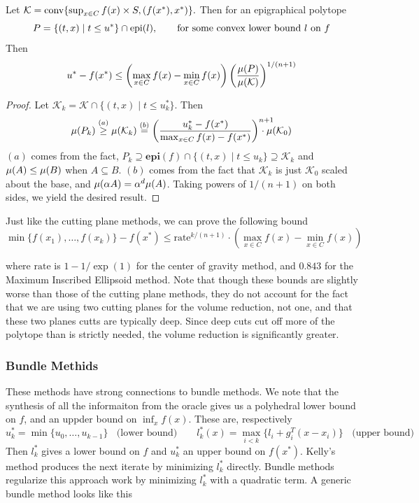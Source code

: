 \begin{lem} \label{lem:non_strongly_convex_convergencegen}
Let  $\mathcal{K}=\mbox{{\rm conv}}\{\sup_{x\in C} f(x) \times  S,(f(x^*),x^*)\}.$
Then for an epigraphical polytope $$P =\{(t,x)\mid t\leq u^*\}\cap \mbox{\normalfont epi}(l), \qquad \mbox{for some convex lower bound $l$ on $f$}
$$
Then \[
u^*-f(x^*)\leq \left(\max_{x\in C}f(x)-\min_{x\in C}f(x) \right) \left( \frac{\mu(P)}{\mu(\mathcal{K})} \right)^{1/(n+1)}
\]
\end{lem}
\begin{proof}
Let $\mathcal{K}_k =\mathcal{K}\cap\{(t,x)\mid t \leq u^*_k\}$. Then 
\[
  \volmu(P_k)\overset{(a)}{\geq}\volmu(\mathcal{K}_k)\overset{(b)}{=}
  \left(\frac{u^*_k-f(x^*)}{\max_{x\in C} f(x) -f(x^*)}\right)^{n+1} \!\!\!\!\!\!\!\!\!\cdot \volmu(\mathcal{K}_0)
\]
$(a)$ comes from the fact, $P_k\supseteq \mathbf{epi}(f) \cap \{(t,x) \mid t \leq u_k\} \supseteq \mathcal{K}_k$ and
$\mu(A)\leq\mu(B)$ when $A\subseteq B$. $(b)$ comes from the fact
that $\mathcal{K}_k$ is just $\mathcal{K}_0$ scaled about the
base, and $\mu(\alpha A)=\alpha^{d}\mu(A)$.
Taking powers of $1/(n+1)$ on both sides, we yield the desired result.
\end{proof}

Just like the cutting plane methods, we can prove the following bound
$$
\min\{f(x_{1}),\dots,f(x_{k})\}-f(x^{*})\leq \mbox{rate}^{k/(n+1)}\cdot\left(\max_{x\in C}f(x)-\min_{x\in C}f(x)\right)
$$

where $\mbox{rate}$ is $1 - 1/\exp(1)$ for the center of gravity method, and
$0.843$ for the Maximum Inscribed Ellipsoid method. Note that though these
bounds are slightly worse than those of the cutting plane methods, they
do not account for the fact that we are using two cutting planes for the 
volume reduction, not one, and that these two planes cutts are typically deep.
Since deep cuts cut off more of the polytope than is strictly needed, the 
volume reduction is significantly greater.

\subsubsection{Bundle Methids}
These methods have strong connections to bundle methods. We note that the
synthesis of all the informaiton from the oracle gives us a polyhedral lower bound
on $f$, and an uppder bound on $\inf_x f(x)$. These are, respectively
$$
u^*_k = \min{ \{ u_0, \dots, u_{k-1}\} } \;\; \mbox{ (lower bound)} \qquad 
l^*_k(x) = \max_{i < k}\{l_i + g_i^T(x-x_i)\} \;\; \mbox{ (upper bound)}
$$Then $l^*_k$ gives a lower bound on $f$ and $u_k^*$ an upper bound on $f(x^*)$. Kelly's method \cite{kelley1960cutting} produces the next iterate by minimizing $l^*_k$ directly. Bundle methods \cite{lemarechal1975extension,wolfe1975method} regularize this approach work by minimizing $l_k^*$ with a quadratic term. A generic bundle method looks like this

